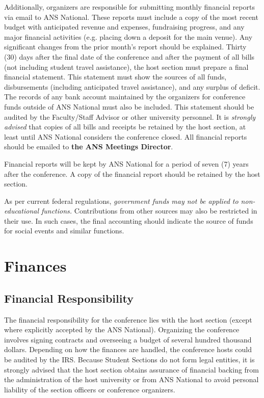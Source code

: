 \documentclass[12pt]{article}
\begin{document}
Additionally, organizers are responsible for submitting monthly financial reports via email to ANS National.
These reports must include a copy of the most recent budget with anticipated revenue and expenses, fundraising progress, and any major financial activities (e.g. placing down a deposit for the main venue).
Any significant changes from the prior month's report should be explained.
Thirty (30) days after the final date of the conference and after the payment of all bills (not including student travel assistance), the host section must prepare a final financial statement.
This statement must show the sources of all funds, disbursements (including anticipated travel assistance), and any surplus of deficit.
The records of any bank account maintained by the organizers for conference funds outside of ANS National must also be included.
This statement should be audited by the Faculty/Staff Advisor or other university personnel.
It is \emph{strongly advised} that copies of all bills and receipts be retained by the host section, at least until ANS National considers the conference closed.
All financial reports should be emailed to \textbf{the ANS Meetings Director}.

Financial reports will be kept by ANS National for a period of seven (7) years after the conference.
A copy of the financial report should be retained by the host section.

As per current federal regulations, \emph{government funds may not be applied to non-educational functions.}
Contributions from other sources may also be restricted in their use.
In such cases, the final accounting should indicate the source of funds for social events and similar functions.

\clearpage
\section{Finances}
\subsection{Financial Responsibility}
The financial responsibility for the conference lies with the host section (except where explicitly accepted by the ANS National).
Organizing the conference involves signing contracts and overseeing a budget of several hundred thousand dollars.
Depending on how the finances are handled, the conference hosts could be audited by the IRS.
Because Student Sections do not form legal entities, it is strongly advised that the host section obtains assurance of financial backing from the administration of the host university or from ANS National to avoid personal liability of the section officers or conference organizers.
\end{document}
